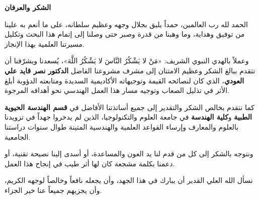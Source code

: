 \thispagestyle{plain}
\vspace*{0.5cm}

\begin{center}
\begin{Arabic}
{\fontsize{18}{22}\selectfont\bfseries الشكر والعرفان}
\end{Arabic}
\end{center}
\vspace{0.6cm}

\begin{Arabic}
\fontsize{12}{22}\selectfont
{}

الحمد لله رب العالمين، حمداً يليق بجلال وجهه وعظيم سلطانه، على ما أنعم به علينا من توفيق وهداية، وما وهبنا من قدرة وصبر حتى وصلنا إلى إتمام هذا البحث وتكليل مسيرتنا العلمية بهذا الإنجاز.

وعملاً بالهدي النبوي الشريف: «مَنْ لا يَشْكُرُ النَّاسَ لا يَشْكُرُ اللَّهَ»، يُسعدنا ويشرّفنا أن نتقدم ببالغ الشكر وعظيم الامتنان إلى مشرف مشروعنا الفاضل \textbf{الدكتور نصر قايد علي العودي}، الذي كان لنصائحه القيمة وتوجيهاته الأكاديمية السديدة ومتابعته الدؤوبة أبلغ الأثر في تذليل الصعاب وتوجيه مسار هذا العمل الهندسي نحو أهدافه المرجوة.

كما نتقدم بخالص الشكر والتقدير إلى جميع أساتذتنا الأفاضل في \textbf{قسم الهندسة الحيوية الطبية} و\textbf{كلية الهندسة} في جامعة العلوم والتكنولوجيا، الذين لم يدخروا جهداً في تزويدنا بالعلوم والمعارف وإرساء القواعد العلمية والهندسية المتينة طوال سنوات دراستنا الجامعية.

ونتوجه بالشكر إلى كل من قدم لنا يد العون والمساعدة، أو أسدى إلينا نصيحة تقنية، أو دعمنا بكلمة مشجعة كان لها أثر طيب في إنجاح هذا العمل.

نسأل الله العلي القدير أن يبارك في هذا الجهد، وأن يجعله نافعاً وخالصاً لوجهه الكريم، وأن يجزيهم جميعاً عنا خير الجزاء.

\end{Arabic}

\normalsize
\clearpage
